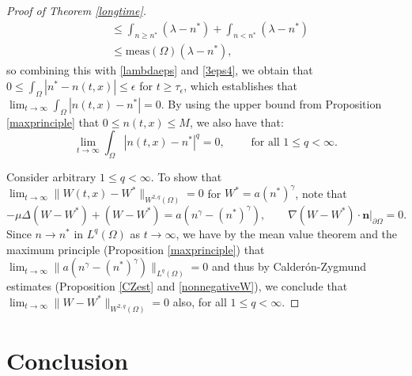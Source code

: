 \documentclass[12pt]{article}
\newcommand{\bd}{\boldsymbol}
\theoremstyle{plain}
\begin{document}
\begin{proof}[Proof of Theorem \ref{longtime}]
\begin{align*}
&\le \int_{n \ge n^{*}} (\lambda - n^{*}) + \int_{n < n^{*}} (\lambda - n^{*}) \\
&\le \text{meas}(\Omega) (\lambda - n^{*}),
\end{align*}
so combining this with \eqref{lambdaeps} and \eqref{3eps4}, we obtain that $\displaystyle 0 \le \int_{\Omega} |n^{*} - n(t, x)| \le \epsilon$ for $t \ge \tau_{\epsilon}$, which establishes that $\displaystyle \lim_{t \to \infty} \int_{\Omega} |n(t, x) - n^{*}| = 0$. By using the upper bound from Proposition \ref{maxprinciple} that $0 \le n(t, x) \le M$, we also have that:
\begin{equation}\label{Lpconv}
\lim_{t \to \infty} \int_{\Omega} |n(t, x) - n^{*}|^{q} = 0, \qquad \text{ for all } 1 \le q < \infty.
\end{equation}

Consider arbitrary $1 \le q < \infty$. To show that $\lim_{t \to \infty} \|W(t, x) - W^{*}\|_{W^{2, q}(\Omega)} = 0$ for $W^{*} = a(n^{*})^{\gamma}$, note that
\begin{equation*}
-\mu \Delta (W - W^{*}) + (W - W^{*}) = a(n^{\gamma} - (n^{*})^{\gamma}), \qquad \nabla (W - W^{*}) \cdot \bd{n}|_{\partial \Omega} = 0.
\end{equation*}
Since $n \to n^{*}$ in $L^{q}(\Omega)$ as $t \to \infty$, we have by the mean value theorem and the maximum principle (Proposition \ref{maxprinciple}) that $\lim_{t \to \infty} \|a(n^{\gamma} - (n^{*})^{\gamma})\|_{L^{q}(\Omega)} = 0$ and thus by Calder\'{o}n-Zygmund estimates (Proposition \ref{CZest} and \ref{nonnegativeW}), we conclude that $\lim_{t \to \infty} \|W - W^{*}\|_{W^{2, q}(\Omega)} = 0$ also, for all $1 \le q < \infty$.
\end{proof}

\section{Conclusion}
\end{document}
